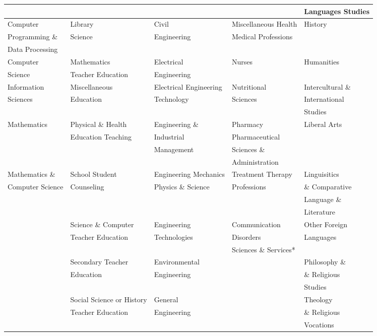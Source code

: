\documentclass[11pt]{article}
\theoremstyle{definition}
\begin{document}
\begin{center}
\begin{tabular}{|l| l| l| l |l|}
  & & & & Languages Studies \\
  \hline \rowcolor{Gray}
Computer  & Library & Civil & Miscellaneous Health & History \\
\rowcolor{Gray}
 Programming \& & Science & Engineering & Medical Professions & \\
 \rowcolor{Gray}
Data Processing  & & & & \\
  \hline
Computer & Mathematics & Electrical & Nurses & Humanities \\
Science  & Teacher Education & Engineering & &  \\
  \hline \rowcolor{Gray}
 Information & Miscellaneous & Electrical Engineering & Nutritional & Intercultural \& \\
 \rowcolor{Gray}
 Sciences & Education & Technology & Sciences & International \\
  \rowcolor{Gray}
   & & & & Studies \\
 \hline 
 Mathematics &  Physical \& Health & Engineering \& & Pharmacy  &  Liberal Arts \\
 & Education Teaching & Industrial  & Pharmaceutical & \\
 &  & Management & Sciences \&  & \\
 &  &  & Administration & \\
  \hline \rowcolor{Gray}
 Mathematics \& & School Student & Engineering Mechanics & Treatment Therapy & Linguisitics\\
 \rowcolor{Gray}
 Computer Science & Counseling & Physics \& Science & Professions & \& Comparative\\
 \rowcolor{Gray}
  & & & & Language \&\\
  \rowcolor{Gray}
  & & & & Literature \\
  \hline
  &  Science \& Computer & Engineering &  Communication & Other Foreign  \\
  & Teacher Education & Technologies &  Disorders & Languages \\
   & & & Sciences \& Services*  & \\
\hline \rowcolor{Gray}
 & Secondary Teacher & Environmental &  & Philosophy \&\\
 \rowcolor{Gray}
 & Education & Engineering & & \& Religious \\
 \rowcolor{Gray}
  & & & & Studies \\
 \hline 
 & Social Science or History & General & & Theology\\
 & Teacher Education & Engineering & & \& Religious \\
  & & & & Vocations \\
 \hline\hline
\end{tabular} 
\endgroup
\end{center}
\end{document}
